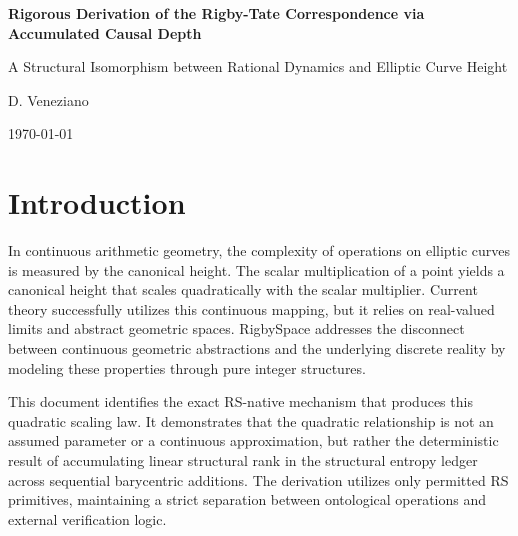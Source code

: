 \documentclass[11pt, letterpaper]{article}
\theoremstyle{definition}
\begin{document}
\begin{center}
  {\LARGE\bfseries\color{RSblue} Rigorous Derivation of the Rigby-Tate Correspondence via Accumulated Causal Depth\par}
  \vspace{0.5cm}
  {\Large\color{RSgray} A Structural Isomorphism between Rational Dynamics and Elliptic Curve Height\par}
  \vspace{0.5cm}
  {\large D. Veneziano\par}
  \vspace{0.5cm}
  {\normalsize \today\par}
\end{center}

\vspace{1cm}

\begin{abstract}
This document establishes a rigorous structural isomorphism between the sequential barycentric evolution of a rational dynamical system and the scalar multiplication operation on elliptic curves. Heuristic magnitude arguments and continuous asymptotic notations are entirely replaced with strict integer derivations using the RS structural rank function and the accumulated causal depth ledger. It is proven that the accumulated structural interaction required to advance the system by $m$ states scales quadratically as exactly $m(m+1)/2$. This discrete quadratic accumulation provides a native, exact integer analogue for the canonical height on elliptic curves, deriving the property strictly from atomic operators without asserting the conclusion as a premise.
\end{abstract}

\section{Introduction}

In continuous arithmetic geometry, the complexity of operations on elliptic curves is measured by the canonical height. The scalar multiplication of a point yields a canonical height that scales quadratically with the scalar multiplier. Current theory successfully utilizes this continuous mapping, but it relies on real-valued limits and abstract geometric spaces. RigbySpace addresses the disconnect between continuous geometric abstractions and the underlying discrete reality by modeling these properties through pure integer structures. 

This document identifies the exact RS-native mechanism that produces this quadratic scaling law. It demonstrates that the quadratic relationship is not an assumed parameter or a continuous approximation, but rather the deterministic result of accumulating linear structural rank in the structural entropy ledger across sequential barycentric additions. The derivation utilizes only permitted RS primitives, maintaining a strict separation between ontological operations and external verification logic.
\end{document}
